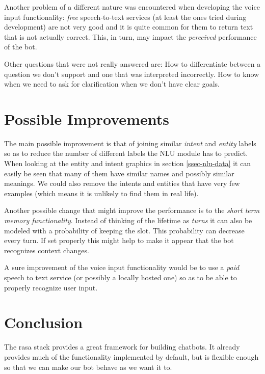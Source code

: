 \documentclass[11pt,a4paper]{article}
\begin{document}
	Another problem of a different nature was encountered when developing the voice input functionality: \textit{free} speech-to-text services (at least the ones tried during development) are not very good and it is quite common for them to return text that is not actually correct. This, in turn, may impact the \textit{perceived} performance of the bot. 
	
	Other questions that were not really answered are: How to differentiate between a question we don't support and one that was interpreted incorrectly. How to know when we need to ask for clarification when we don't have clear goals.


\section{Possible Improvements}
	
	The main possible improvement is that of joining similar \textit{intent} and \textit{entity} labels so as to reduce the number of different labels the NLU module has to predict. When looking at the entity and intent graphics in section \ref{ssec-nlu-data} it can easily be seen that many of them have similar names and possibly similar meanings. We could also remove the intents and entities that have very few examples (which means it is unlikely to find them in real life).
	
	Another possible change that might improve the performance is to the \textit{short term memory functionality}. Instead of thinking of the lifetime as \textit{turns} it can also be modeled with a probability of keeping the slot. This probability can decrease every turn. If set properly this might help to make it appear that the bot recognizes context changes. 
	
	A sure improvement of the voice input functionality would be to use a \textit{paid} speech to text service (or possibly a locally hosted one) so as to be able to properly recognize user input.

\section{Conclusion}
\label{sec-conclusion}
	
	The rasa stack provides a great framework for building chatbots. It already provides much of the functionality implemented by default, but is flexible enough so that we can make our bot behave as we want it to. 
	
\end{document}
